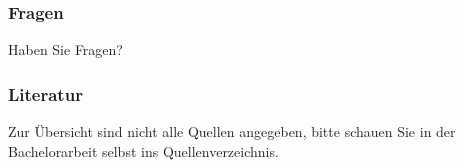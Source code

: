 \documentclass[ngerman, fleqn]{beamer}
\begin{document}
\begin{frame}
    \frametitle{Fragen}

    Haben Sie Fragen?
\end{frame}

\begin{frame}
    \frametitle{Literatur}

    \printbibliography

    \begin{small}
    Zur Übersicht sind nicht alle Quellen angegeben, bitte schauen Sie in der
    Bachelorarbeit selbst ins Quellenverzeichnis.
    \end{small}
\end{frame}
\end{document}
